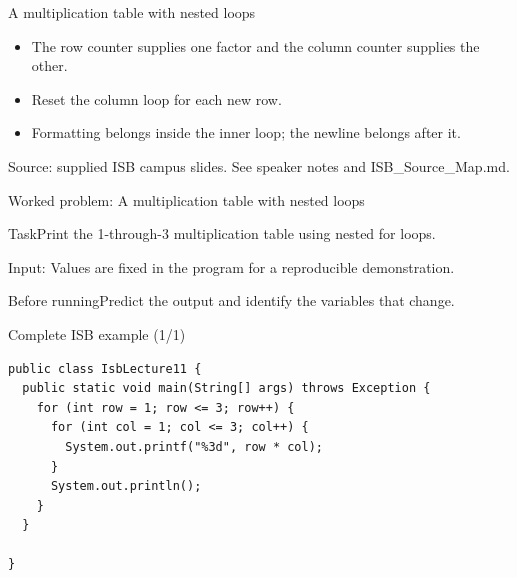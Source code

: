 \documentclass[10pt,aspectratio=169]{beamer}
\begin{document}
\begin{frame}[fragile,t]{A multiplication table with nested loops}
\begin{itemize}
\item The row counter supplies one factor and the column counter supplies the other.
\item Reset the column loop for each new row.
\item Formatting belongs inside the inner loop; the newline belongs after it.
\end{itemize}
\vspace{3mm}\footnotesize\textcolor{accent}{Source: supplied ISB campus slides. See speaker notes and ISB\_Source\_Map.md.}
\end{frame}

\begin{frame}[fragile,t]{Worked problem: A multiplication table with nested loops}
\begin{block}{Task}Print the 1{-}through{-}3 multiplication table using nested for loops.\end{block}
\small Input: Values are fixed in the program for a reproducible demonstration.\par\vspace{3mm}\begin{exampleblock}{Before running}Predict the output and identify the variables that change.\end{exampleblock}
\end{frame}

\begin{frame}[fragile,t]{Complete ISB example (1/1)}
\begin{lstlisting}
public class IsbLecture11 {
  public static void main(String[] args) throws Exception {
    for (int row = 1; row <= 3; row++) {
      for (int col = 1; col <= 3; col++) {
        System.out.printf("%3d", row * col);
      }
      System.out.println();
    }
  }

}
\end{lstlisting}
\end{frame}
\end{document}
